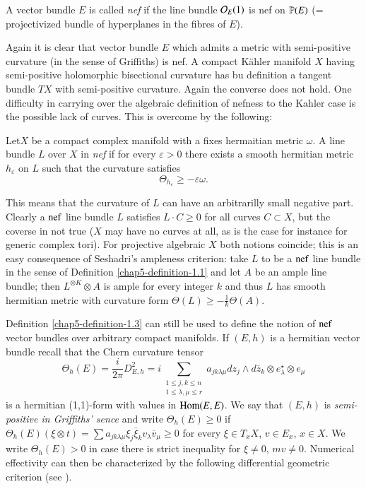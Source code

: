 \begin{definition}\label{chap5-definition-1.3}
A vector bundle $E$ is called \textit{nef} if the line bundle $\mathcal{O}_{E}(1)$ is nef on $\mathbb{P}(E)$ (= projectivized bundle of hyperplanes in the fibres of $E$).

Again it is clear that vector bundle $E$ which admits a metric with semi-positive curvature (in the sense of Griffiths) is nef. A compact K\"ahler manifold $X$ having semi-positive holomorphic bisectional curvature has bu definition a tangent bundle $TX$ with semi-positive curvature. Again the converse does not hold. One difficulty in carrying over the algebraic definition of nefness to the Kahler case is the possible lack of curves. This is overcome by the following:
\end{definition}

\begin{definition}\label{chap5-definition-1.4}
Let\pageoriginale $X$ be a compact complex manifold with a fixes hermaitian metric $\omega$. A line bundle $L$ over $X$ in \textit{nef} if for every $\varepsilon > 0$ there exists a smooth hermitian metric $h_{\varepsilon}$ on $L$ such that the curvature satisfies
$$
\Theta_{h_{\varepsilon}} \geq -\varepsilon\omega.
$$

This means that the curvature of $L$ can have an arbitrarilly small negative part. Clearly a $\operatorname{nef}$ line bundle $L$ satisfies $L\cdot C \geq 0$ for all curves $C\subset X$, but the coverse in not true ($X$ may have no curves at all, as is the case for instance for generic complex tori). For projective algebraic $X$ both notions coincide; this is an easy consequence of Seshadri's ampleness criterion: take $L$ to be a $\operatorname{nef}$ line bundle in the sense of Definition
\ref{chap5-definition-1.1} and let $A$ be an ample line bundle; then $L^{\otimes K}\otimes A$ is ample for every integer $k$ and thus $L$ has smooth hermitian metric with curvature form $\Theta(L) \geq -\frac{1}{k}\Theta(A)$.

Definition \ref{chap5-definition-1.3} can still be used to define the notion of $\operatorname{nef}$ vector bundles over arbitrary compact manifolds. If $(E, h)$ is a hermitian vector bundle recall that the Chern curvature tensor
$$
\Theta_{h}(E) =\dfrac{i}{2\pi}D_{E, h}^{2} = i \sum\limits_{\substack{1 \leq j , k\leq n \\ 1 \leq \lambda, \mu \leq r}}
a_{jk\lambda\mu}dz_{j} \wedge d\overline{z}_{k}\otimes e_{\lambda}^{\star}\otimes e_{\mu}
$$
is a hermitian (1,1)-form with values in $\operatorname{Hom}(E, E)$. We say that $(E, h)$ is \textit{semi-positive in Griffiths' sence} \cite{chap5-keyGr69} and write $\Theta_{h}(E) \geq 0$ if $\Theta_{h}(E)(\xi \otimes t) = \sum a_{jk\lambda \mu} \xi_{j}\overline{\xi}_{k}v_{\lambda}\overline{v}_{\mu}\geq 0$ for every $\xi \in T_{x}X$, $v\in E_{x}$, $x\in X$. We write $\Theta_{h}(E)> 0$ in case there is strict inequality for $\xi \neq 0$, $m v\neq 0$. Numerical effectivity can then be characterized by the following differential geometric criterion (see \cite{chap5-keyDe91}).  
\end{definition}


